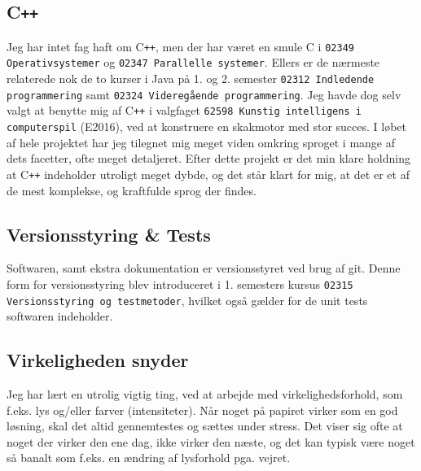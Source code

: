 \subsection{C\texttt{++}}
Jeg har intet fag haft om C\texttt{++}, men der har været en smule C i \texttt{02349 Operativsystemer} og \texttt{02347 Parallelle systemer}. Ellers er de nærmeste relaterede nok de to kurser i Java på 1. og 2. semester \texttt{02312 Indledende programmering} samt \texttt{02324 Videregående programmering}.
Jeg havde dog selv valgt at benytte mig af C\texttt{++} i valgfaget \texttt{62598 Kunstig intelligens i computerspil} (E2016), ved at konstruere en skakmotor med stor succes.
I løbet af hele projektet har jeg tilegnet mig meget viden omkring sproget i mange af dets facetter, ofte meget detaljeret. Efter dette projekt er det min klare holdning at C\texttt{++} indeholder utroligt meget dybde, og det står klart for mig, at det er et af de mest komplekse, og kraftfulde sprog der findes.

\subsection{Versionsstyring \& Tests}
Softwaren, samt ekstra dokumentation er versionsstyret ved brug af git. Denne form for versionsstyring blev introduceret i 1. semesters kursus \texttt{02315 Versionsstyring og testmetoder}, hvilket også gælder for de unit tests softwaren indeholder.

\subsection{Virkeligheden snyder}
Jeg har lært en utrolig vigtig ting, ved at arbejde med virkelighedsforhold, som f.eks. lys og/eller farver (intensiteter). Når noget på papiret virker som en god løsning, skal det altid gennemtestes og sættes under stress.
Det viser sig ofte at noget der virker den ene dag, ikke virker den næste, og det kan typisk være noget så banalt som f.eks. en ændring af lysforhold pga. vejret.

